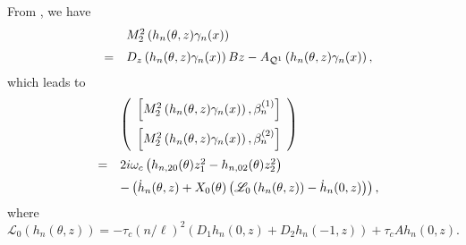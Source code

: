 \documentclass[11pt]{article}
\theoremstyle{definition}
\theoremstyle{remark}
\numberwithin{equation}{section}
\begin{document}

From  \cite{Faria-00TAMS} , we have
$$
\begin{array}{lll}
&&M_2^2\left( h_n(\theta,z) \gamma_n(x)\right)\vspace{0.2cm}\\
&=& D_z\left( h_n(\theta,z) \gamma_n(x)\right)Bz -A_{\mathcal{Q}^1}\left( h_n(\theta,z) \gamma_n(x)\right),
\end{array}
$$
which leads to
 \begin{equation}
 \label{M22HJ}
 \begin{array}{lll}
 &&   \left(\begin{array}{c}
\left[M_2^2\left( h_n(\theta,z) \gamma_n(x)\right), \beta_n^{(1)}\right]\vspace{0.2cm}\\
\left[M_2^2\left( h_n(\theta,z) \gamma_n(x)\right), \beta_n^{(2)}\right]
\end{array}\right)\vspace{0.2cm}\\
&=&2i\omega_c\left(h_{n,20} (\theta)z_1^2- h_{n,02}(\theta)z_2^2\right)\vspace{0.2cm}\\
&&-\left(\dot{h}_n(\theta, z)+X_0(\theta)\left(\mathscr{L}_0 \left(h_n(\theta, z)\right)- \dot{h}_n(0, z)\right)\right),
\end{array}
\end{equation}
where
$$
\mathscr{L}_0\left( h_n(\theta, z)\right)= -\tau_c(n/\ell)^2\left( D_1 h_n(0, z)+D_2h_n(-1, z) \right)+\tau_cAh_n(0, z).
$$
\end{document}
